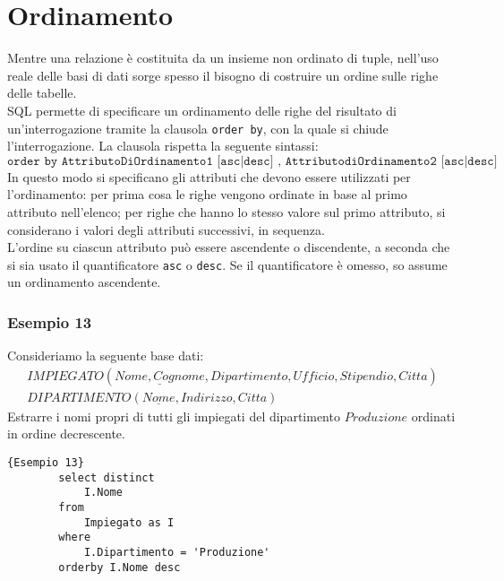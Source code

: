 \section{Ordinamento}
Mentre una relazione è costituita da un insieme non ordinato di tuple, nell'uso reale delle basi di dati sorge spesso il bisogno di costruire un ordine sulle righe delle tabelle.\\
SQL permette di specificare un ordinamento delle righe del risultato di un'interrogazione tramite la clausola \texttt{order by}, con la quale si chiude l'interrogazione. La clausola rispetta la seguente sintassi:
    $$\texttt{order by AttributoDiOrdinamento1 [asc|desc] {, AttributodiOrdinamento2 [asc|desc]}}$$
In questo modo si specificano gli attributi che devono essere utilizzati per l'ordinamento: per prima cosa le righe vengono ordinate in base al primo attributo nell'elenco; per righe che hanno lo stesso valore sul primo attributo, si considerano i valori degli attributi successivi, in sequenza.\\
L'ordine su ciascun attributo può essere ascendente o discendente, a seconda che si sia usato il quantificatore \texttt{asc} o \texttt{desc}. Se il quantificatore è omesso, so assume un ordinamento ascendente.

\subsubsection{Esempio 13}
Consideriamo la seguente base dati:
    \begin{equation}\begin{aligned}
        IMPIEGATO (\underline{Nome, Cognome}, Dipartimento, Ufficio, Stipendio, Citta)\\
        DIPARTIMENTO (\underline{Nome}, Indirizzo, Citta)
    \end{aligned}\end{equation}
Estrarre i nomi propri di tutti gli impiegati del dipartimento $Produzione$ ordinati in ordine decrescente.
    \begin{lstlisting}{Esempio 13}
        select distinct
            I.Nome
        from 
            Impiegato as I
        where 
            I.Dipartimento = 'Produzione'
        orderby I.Nome desc
    \end{lstlisting}